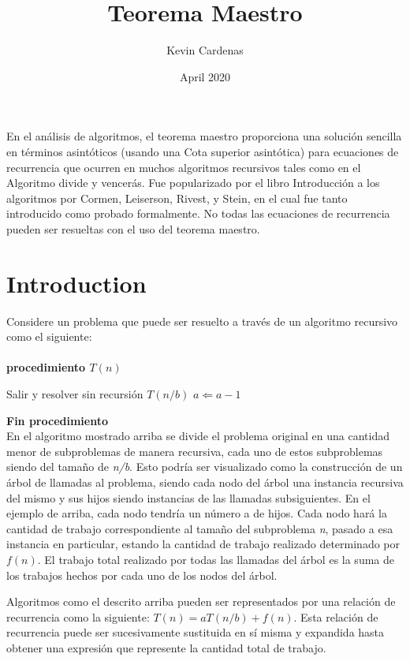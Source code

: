\documentclass[12pt]{article}
\title{Teorema Maestro}
\author{Kevin Cardenas}
\date{April 2020}
\begin{document}
\maketitle
En el análisis de algoritmos, el teorema maestro proporciona una solución sencilla en términos asintóticos (usando una Cota superior asintótica) para ecuaciones de recurrencia que ocurren en muchos algoritmos recursivos tales como en el Algoritmo divide y vencerás. Fue popularizado por el libro Introducción a los algoritmos por Cormen, Leiserson, Rivest, y Stein, en el cual fue tanto introducido como probado formalmente. No todas las ecuaciones de recurrencia pueden ser resueltas con el uso del teorema maestro. 

\tableofcontents %
\newpage
\section{Introduction}
Considere un problema que puede ser resuelto a través de un algoritmo recursivo como el siguiente:\\\\ \textbf{procedimiento $T(n)$}
\begin{algorithmic}
        \State Salir y resolver sin recursión
    \Else
            \State  $ T(n/b)$
            \State $a \Leftarrow a - 1$
        \EndWhile
    \EndIf
\end{algorithmic}
\textbf{Fin procedimiento}\\

En el algoritmo mostrado arriba se divide el problema original en una cantidad menor de subproblemas de manera recursiva, cada uno de estos subproblemas siendo del tamaño de \textit{n/b}. Esto podría ser visualizado como la construcción de un árbol de llamadas al problema, siendo cada nodo del árbol una instancia recursiva del mismo y sus hijos siendo instancias de las llamadas subsiguientes. En el ejemplo de arriba, cada nodo tendría un número a de hijos. Cada nodo hará la cantidad de trabajo correspondiente al tamaño del subproblema \textit{n}, pasado a esa instancia en particular, estando la cantidad de trabajo realizado determinado por $f(n)$. El trabajo total realizado por todas las llamadas del árbol es la suma de los trabajos hechos por cada uno de los nodos del árbol.

Algoritmos como el descrito arriba pueden ser representados por una relación de recurrencia como la siguiente: $T(n)=aT(n/b)+f(n)$. Esta relación de recurrencia puede ser sucesivamente sustituida en sí misma y expandida hasta obtener una expresión que represente la cantidad total de trabajo.\cite{astra}
\end{document}

